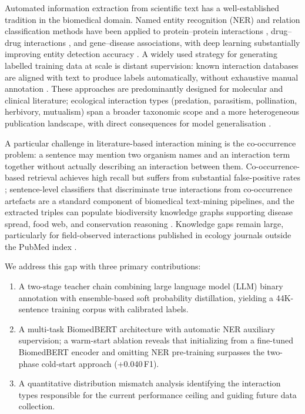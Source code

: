 \documentclass[a4paper,fleqn]{cas-sc}
\begin{document}
Automated information extraction from scientific text has a well-established
tradition in the biomedical domain.
Named entity recognition (NER) and relation classification methods have been
applied to protein--protein interactions \citep{bunescu2005comparative},
drug--drug interactions \citep{lim2018drug}, and gene--disease associations,
with deep learning substantially improving entity detection accuracy
\citep{habibi2017deep}.
A widely used strategy for generating labelled training data at scale is
distant supervision: known interaction databases are aligned with text to
produce labels automatically, without exhaustive manual annotation
\citep{mintz2009distant}.
These approaches are predominantly designed for molecular and clinical
literature; ecological interaction types (predation, parasitism, pollination,
herbivory, mutualism) span a broader taxonomic scope and a more heterogeneous
publication landscape, with direct consequences for model generalisation
\citep{thessen2012nlp}.

A particular challenge in literature-based interaction mining is the
co-occurrence problem: a sentence may mention two organism names and an
interaction term together without actually describing an interaction between
them. Co-occurrence-based retrieval achieves high recall but suffers from
substantial false-positive rates \citep{bunescu2005comparative};
sentence-level classifiers that discriminate true interactions from
co-occurrence artefacts are a standard component of biomedical
text-mining pipelines, and the extracted triples can populate biodiversity
knowledge graphs supporting disease spread, food web, and conservation
reasoning \citep{page2016biodiversity, poisot2021global}. Knowledge gaps
remain large, particularly for field-observed interactions published in
ecology journals outside the PubMed index \citep{poisot2021global}.

We address this gap with three primary contributions:
\begin{enumerate}
    \item A two-stage teacher chain combining large language model (LLM)
    binary annotation with ensemble-based soft probability distillation, yielding a
    44K-sentence training corpus with calibrated labels.
    \item A multi-task BiomedBERT architecture with automatic NER auxiliary
    supervision; a warm-start ablation reveals that initializing from a
    fine-tuned BiomedBERT encoder and omitting NER pre-training surpasses
    the two-phase cold-start approach (+0.040\,F1).
    \item A quantitative distribution mismatch analysis identifying the
    interaction types responsible for the current performance ceiling and
    guiding future data collection.
\end{enumerate}
\end{document}
